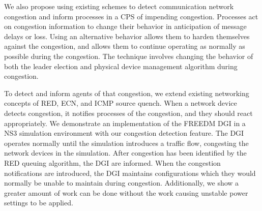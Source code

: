 We also propose using existing schemes to detect communication network congestion and inform processes in a \ac{CPS} of impending congestion.
Processes act on congestion information to change their behavior in anticipation of message delays or loss.
Using an alternative behavior allows them to harden themselves against the congestion, and allows them to continue operating as normally as possible during the congestion.
The technique involves changing the behavior of both the leader election\cite{INVITATIONELECTION} and physical device management algorithm during congestion.

To detect and inform agents of that congestion, we extend existing networking concepts of \ac{RED}, \ac{ECN}\cite{RFCECN}, and ICMP source quench\cite{RFCSOURCEQUENCH}.
When a network device detects congestion, it notifies processes of the congestion, and they should react appropriately.
We demonstrate an implementation of the \ac{FREEDM} \ac{DGI} in a \ac{NS3} simulation environment\cite{NS3} with our congestion detection feature.
The \ac{DGI} operates normally until the simulation introduces a traffic flow, congesting the network devices in the simulation.
After congestion has been identified by the \ac{RED} queuing algorithm, the \ac{DGI} are informed. %
When the congestion notifications are introduced, the \ac{DGI} maintains configurations which they would normally be unable to maintain during congestion.
Additionally, we show a greater amount of work can be done without the work causing unstable power settings to be applied.


